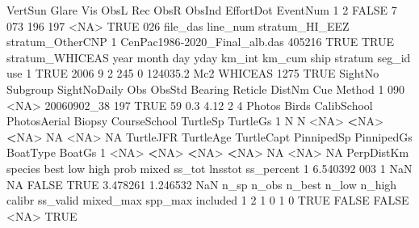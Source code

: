 \documentclass[
]{book}
\newenvironment{Shaded}{\begin{snugshade}}{\end{snugshade}}
\newcommand{\ConstantTok}[1]{\textcolor[rgb]{0.00,0.00,0.00}{#1}}
\newcommand{\DecValTok}[1]{\textcolor[rgb]{0.00,0.00,0.81}{#1}}
\newcommand{\ErrorTok}[1]{\textcolor[rgb]{0.64,0.00,0.00}{\textbf{#1}}}
\newcommand{\FloatTok}[1]{\textcolor[rgb]{0.00,0.00,0.81}{#1}}
\newcommand{\NormalTok}[1]{#1}
\newcommand{\SpecialCharTok}[1]{\textcolor[rgb]{0.00,0.00,0.00}{#1}}
\begin{document}
\begin{Shaded}
\begin{Highlighting}[]
\NormalTok{  VertSun Glare Vis ObsL Rec ObsR ObsInd EffortDot EventNum}
\DecValTok{1}       \DecValTok{2} \ConstantTok{FALSE}   \DecValTok{7}  \DecValTok{073} \DecValTok{196}  \DecValTok{197}   \SpecialCharTok{\textless{}}\ConstantTok{NA}\SpecialCharTok{\textgreater{}}      \ConstantTok{TRUE}      \DecValTok{026}
\NormalTok{                       file\_das line\_num stratum\_HI\_EEZ stratum\_OtherCNP}
\DecValTok{1}\NormalTok{ CenPac1986}\SpecialCharTok{{-}}\NormalTok{2020\_Final\_alb.das   }\DecValTok{405216}           \ConstantTok{TRUE}             \ConstantTok{TRUE}
\NormalTok{  stratum\_WHICEAS year month day yday km\_int   km\_cum ship stratum seg\_id  use}
\DecValTok{1}            \ConstantTok{TRUE} \DecValTok{2006}     \DecValTok{9}   \DecValTok{2}  \DecValTok{245}      \DecValTok{0} \FloatTok{124035.2}\NormalTok{  Mc2 WHICEAS   }\DecValTok{1275} \ConstantTok{TRUE}
\NormalTok{  SightNo Subgroup SightNoDaily Obs ObsStd Bearing Reticle DistNm Cue Method}
\DecValTok{1}     \DecValTok{090}     \SpecialCharTok{\textless{}}\ConstantTok{NA}\SpecialCharTok{\textgreater{}}\NormalTok{  20060902\_38 }\DecValTok{197}   \ConstantTok{TRUE}      \DecValTok{59}     \FloatTok{0.3}   \FloatTok{4.12}   \DecValTok{2}      \DecValTok{4}
\NormalTok{  Photos Birds CalibSchool PhotosAerial Biopsy CourseSchool TurtleSp TurtleGs}
\DecValTok{1}\NormalTok{      N     N        }\SpecialCharTok{\textless{}}\ConstantTok{NA}\SpecialCharTok{\textgreater{}}         \ErrorTok{\textless{}}\ConstantTok{NA}\SpecialCharTok{\textgreater{}}   \ErrorTok{\textless{}}\ConstantTok{NA}\SpecialCharTok{\textgreater{}}           \ConstantTok{NA}     \SpecialCharTok{\textless{}}\ConstantTok{NA}\SpecialCharTok{\textgreater{}}       \ConstantTok{NA}
\NormalTok{  TurtleJFR TurtleAge TurtleCapt PinnipedSp PinnipedGs BoatType BoatGs}
\DecValTok{1}      \SpecialCharTok{\textless{}}\ConstantTok{NA}\SpecialCharTok{\textgreater{}}      \ErrorTok{\textless{}}\ConstantTok{NA}\SpecialCharTok{\textgreater{}}       \ErrorTok{\textless{}}\ConstantTok{NA}\SpecialCharTok{\textgreater{}}       \ErrorTok{\textless{}}\ConstantTok{NA}\SpecialCharTok{\textgreater{}}         \ConstantTok{NA}     \SpecialCharTok{\textless{}}\ConstantTok{NA}\SpecialCharTok{\textgreater{}}     \ConstantTok{NA}
\NormalTok{  PerpDistKm species best low high  prob mixed   ss\_tot  lnsstot ss\_percent}
\DecValTok{1}   \FloatTok{6.540392}     \DecValTok{003}    \DecValTok{1} \ConstantTok{NaN}   \ConstantTok{NA} \ConstantTok{FALSE}  \ConstantTok{TRUE} \FloatTok{3.478261} \FloatTok{1.246532}        \ConstantTok{NaN}
\NormalTok{  n\_sp n\_obs n\_best n\_low n\_high calibr ss\_valid mixed\_max spp\_max included}
\DecValTok{1}    \DecValTok{2}     \DecValTok{1}      \DecValTok{0}     \DecValTok{1}      \DecValTok{0}   \ConstantTok{TRUE}    \ConstantTok{FALSE}     \ConstantTok{FALSE}    \SpecialCharTok{\textless{}}\ConstantTok{NA}\SpecialCharTok{\textgreater{}}     \ConstantTok{TRUE}
\end{Highlighting}
\end{Shaded}
\end{document}

